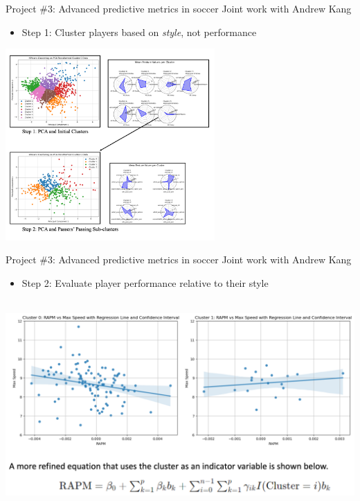 \documentclass{beamer}
\begin{document}
\begin{frame}{Project \#3: Advanced predictive metrics in soccer}
  {Joint work with Andrew Kang}
  \begin{itemize}
    \item Step 1: Cluster players based on {\it style}, not performance
  \end{itemize}
  \centering
  \includegraphics[width = 0.6\textwidth]{images/opta_clusters.png}
\end{frame}


\begin{frame}{Project \#3: Advanced predictive metrics in soccer}
  {Joint work with Andrew Kang}
  \begin{itemize}
    \item Step 2: Evaluate player performance relative to their style
  \end{itemize}
  ~\\
  \includegraphics[width = \textwidth]{images/opta_bpm.png}
\end{frame}
\end{document}
